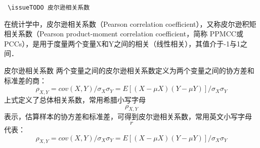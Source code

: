
\verb | \issueTODO 皮尔逊相关系数|

在统计学中，皮尔逊相关系数（Pearson correlation coefficient），又称皮尔逊积矩相关系数（Pearson product-moment correlation coefficient，简称 PPMCC或PCCs），是用于度量两个变量X和Y之间的相关（线性相关），其值介于-1与1之间．
\begin{definition}{皮尔逊相关系数}\label{PearsR_def1}
两个变量之间的皮尔逊相关系数定义为两个变量之间的协方差和标准差的商：
\begin{equation}
\rho_{X,Y}=cov(X,Y)/\sigma_{X}\sigma_{Y}=E[(X-\mu X)(Y-\mu Y)]/\sigma_{X}\sigma_{Y}
\end{equation}
上式定义了总体相关系数，常用希腊小写字母$$\rho_{X,Y}$$表示，估算样本的协方差和标准差，可得到皮尔逊相关系数，常用英文小写字母$$r$$代表：
\begin{equation}
\rho_{X,Y}=cov(X,Y)/\sigma_{X}\sigma_{Y}=E[(X-\mu X)(Y-\mu Y)]/\sigma_{X}\sigma_{Y}
\end{equation}
\end{definition}
